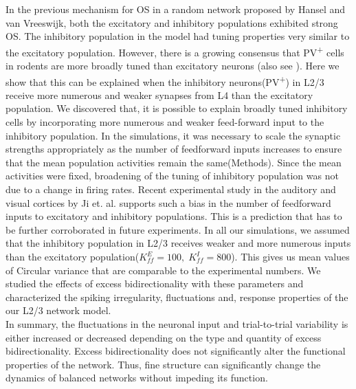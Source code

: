 In the previous mechanism for OS in a random network proposed by Hansel and van Vreeswijk, both the excitatory and inhibitory populations exhibited strong OS. The inhibitory population in the model had tuning properties very similar to the excitatory population. However, there is a growing consensus that PV\textsuperscript{+} cells in rodents are more broadly tuned than excitatory neurons \cite{niell2008highly, kerlin2010broadly, liu2009visual, sohya2007gabaergic, kameyama2010difference} (also see \cite{Runyan2010, Ma2010}). Here we show that this can be explained when the inhibitory neurons(PV\textsuperscript{+}) in L2/3 receive more numerous and weaker synapses from L4 than the excitatory population.  We discovered that, it is possible to explain broadly tuned inhibitory cells by incorporating more numerous and weaker feed-forward input to the inhibitory population. In the simulations, it was necessary to scale the synaptic strengths appropriately as the number of feedforward inputs increases to ensure that the mean population activities remain the same(Methods). Since the mean activities were fixed, broadening of the tuning of inhibitory population was not due to a change in firing rates. Recent experimental study in the auditory and visual cortices by Ji et. al. \cite{Ji2015} supports such a bias in the number of feedforward inputs to excitatory and inhibitory populations. This is a prediction that has to be further corroborated in future experiments. In all our simulations, we assumed that the inhibitory population in L2/3 receives weaker and more numerous inputs than the excitatory population($K_{ff}^{E} = 100, \; K_{ff}^{I} = 800$). This gives us mean values of Circular variance that are comparable to the experimental numbers. We studied the effects of excess bidirectionality with these parameters and characterized the spiking irregularity, fluctuations and, response properties of the our L2/3 network model.  \\

In summary, the fluctuations in the neuronal input and trial-to-trial variability is either increased or decreased depending on the type and quantity of excess bidirectionality. Excess bidirectionality does not significantly alter the functional properties of the network. Thus, fine structure can significantly change the dynamics of balanced networks without impeding its function. 

